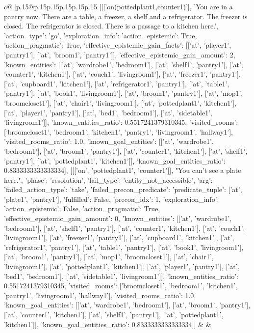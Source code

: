 \documentclass{article}
\begin{document}
{\begin{supertabular}{c@{$\;$}|p{.15\linewidth}@{}p{.15\linewidth}p{.15\linewidth}p{.15\linewidth}p{.15\linewidth}p{.15\linewidth}}
{{{	 [[['on(pottedplant1,counter1)'], 'You are in a pantry now. There are a table, a freezer, a shelf and a refrigerator. The freezer is closed. The refrigerator is closed. There is a passage to a kitchen here.', {'action_type': 'go', 'exploration_info': {'action_epistemic': True, 'action_pragmatic': True, 'effective_epistemic_gain_facts': [['at', 'player1', 'pantry1'], ['at', 'broom1', 'pantry1']], 'effective_epistemic_gain_amount': 2, 'known_entities': [['at', 'wardrobe1', 'bedroom1'], ['at', 'shelf1', 'pantry1'], ['at', 'counter1', 'kitchen1'], ['at', 'couch1', 'livingroom1'], ['at', 'freezer1', 'pantry1'], ['at', 'cupboard1', 'kitchen1'], ['at', 'refrigerator1', 'pantry1'], ['at', 'table1', 'pantry1'], ['at', 'book1', 'livingroom1'], ['at', 'broom1', 'pantry1'], ['at', 'mop1', 'broomcloset1'], ['at', 'chair1', 'livingroom1'], ['at', 'pottedplant1', 'kitchen1'], ['at', 'player1', 'pantry1'], ['at', 'bed1', 'bedroom1'], ['at', 'sidetable1', 'livingroom1']], 'known_entities_ratio': 0.5517241379310345, 'visited_rooms': ['broomcloset1', 'bedroom1', 'kitchen1', 'pantry1', 'livingroom1', 'hallway1'], 'visited_rooms_ratio': 1.0, 'known_goal_entities': [['at', 'wardrobe1', 'bedroom1'], ['at', 'broom1', 'pantry1'], ['at', 'counter1', 'kitchen1'], ['at', 'shelf1', 'pantry1'], ['at', 'pottedplant1', 'kitchen1']], 'known_goal_entities_ratio': 0.8333333333333334}}], [[['on', 'pottedplant1', 'counter1']], "You can't see a plate here.", {'phase': 'resolution', 'fail_type': 'entity_not_accessible', 'arg': {'failed_action_type': 'take', 'failed_precon_predicate': {'predicate_tuple': ['at', 'plate1', 'pantry1'], 'fulfilled': False, 'precon_idx': 1}}, 'exploration_info': {'action_epistemic': False, 'action_pragmatic': True, 'effective_epistemic_gain_amount': 0, 'known_entities': [['at', 'wardrobe1', 'bedroom1'], ['at', 'shelf1', 'pantry1'], ['at', 'counter1', 'kitchen1'], ['at', 'couch1', 'livingroom1'], ['at', 'freezer1', 'pantry1'], ['at', 'cupboard1', 'kitchen1'], ['at', 'refrigerator1', 'pantry1'], ['at', 'table1', 'pantry1'], ['at', 'book1', 'livingroom1'], ['at', 'broom1', 'pantry1'], ['at', 'mop1', 'broomcloset1'], ['at', 'chair1', 'livingroom1'], ['at', 'pottedplant1', 'kitchen1'], ['at', 'player1', 'pantry1'], ['at', 'bed1', 'bedroom1'], ['at', 'sidetable1', 'livingroom1']], 'known_entities_ratio': 0.5517241379310345, 'visited_rooms': ['broomcloset1', 'bedroom1', 'kitchen1', 'pantry1', 'livingroom1', 'hallway1'], 'visited_rooms_ratio': 1.0, 'known_goal_entities': [['at', 'wardrobe1', 'bedroom1'], ['at', 'broom1', 'pantry1'], ['at', 'counter1', 'kitchen1'], ['at', 'shelf1', 'pantry1'], ['at', 'pottedplant1', 'kitchen1']], 'known_goal_entities_ratio': 0.8333333333333334}}]] 
	  } 
	   } 
	   } 
	 & & \\ 
 


\end{supertabular}}
\end{document}
